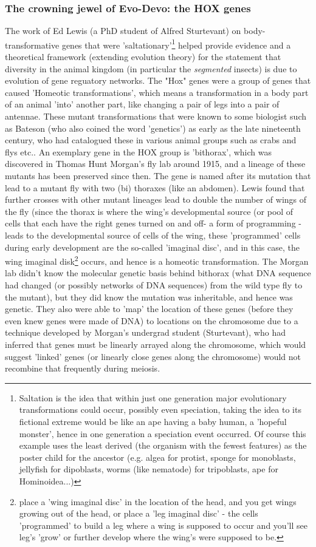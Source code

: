 \subsubsection{The crowning jewel of Evo-Devo: the HOX genes}
The work of Ed Lewis (a PhD student of Alfred Sturtevant) on body-transformative genes that were 'saltationary'\footnote{Saltation is the idea that within just one generation major evolutionary transformations could occur, possibly even speciation, taking the idea to its fictional extreme would be like an ape having a baby human, a 'hopeful monster', hence in one generation a speciation event occurred.  Of course this example uses the least derived (the organism with the fewest features) as the poster child for the ancestor (e.g. algea for protist, sponge for monoblasts, jellyfish for dipoblasts, worms (like nematode) for tripoblasts, ape for Hominoidea...)} helped provide evidence and a theoretical framework (extending evolution theory) for the statement that diversity in the animal kingdom (in particular the \textit{segmented} insects) is due to evolution of gene reguatory networks.  The "Hox" genes were a group of genes that caused 'Homeotic transformations', which means a transformation in a body part of an animal 'into' another part, like changing a pair of legs into a pair of antennae.  These mutant transformations that were known to some biologist such as Bateson (who also coined the word 'genetics') as early as the late nineteenth century, who had catalogued these in various animal groups such as crabs and flys etc..  An exemplary gene in the HOX group is 'bithorax', which was discovered in Thomas Hunt Morgan's fly lab around 1915, and a lineage of these mutants has been preserved since then. The gene is named after its mutation that lead to a mutant fly with two (bi) thoraxes (like an abdomen).  Lewis found that further crosses with other mutant lineages lead to double the number of wings of the fly (since the thorax is where the wing's developmental source (or pool of cells that each have the right genes turned on and off- a form of programming - leads to the developmental source of cells of the wing, these 'programmed' cells during early development are the so-called 'imaginal disc', and in this case, the wing imaginal disk\footnote{place a 'wing imaginal disc' in the location of the head, and you get wings growing out of the head, or place a 'leg imaginal disc' - the cells 'programmed' to build a leg where a wing is supposed to occur and you'll see leg's 'grow' or further develop where the wing's were supposed to be.} occurs, and hence is a homeotic transformation.  The Morgan lab didn't know the molecular genetic basis behind bithorax (what DNA sequence had changed (or possibly networks of DNA sequences) from the wild type fly to the mutant), but they did know the mutation was inheritable, and hence was genetic.  They also were able to 'map' the location of these genes (before they even knew genes were made of DNA) to locations on the chromosome due to a technique developed by Morgan's undergrad student (Sturtevant), who had inferred that genes must be linearly arrayed along the chromosome, which would suggest 'linked' genes (or linearly close genes along the chromosome) would not recombine that frequently during meiosis\cite{sturtevant}.  

